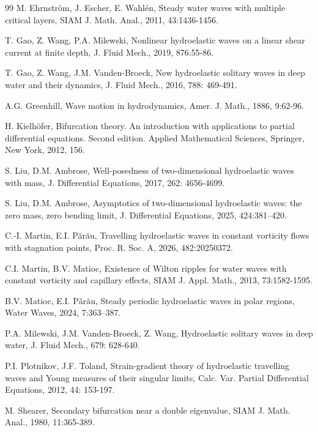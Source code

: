 \documentclass[12pt]{article}
\numberwithin{equation}{section}
\numberwithin{equation}{section}
\begin{document}
\begin{thebibliography}{99}
M. Ehrnstr\"{o}m, J. Escher, E. Wahl\'{e}n, Steady water waves with multiple critical layers, SIAM J. Math. Anal., 2011, 43:1436-1456.

T. Gao, Z. Wang, P.A. Milewski,  Nonlinear hydroelastic waves on a linear shear current at finite depth, J. Fluid Mech., 2019, 876:55-86.

T. Gao, Z. Wang, J.M. Vanden-Broeck, New hydroelastic solitary waves in deep water and their dynamics, J. Fluid Mech., 2016, 788: 469-491.

 A.G. Greenhill, Wave motion in hydrodynamics, Amer. J. Math., 1886, 9:62-96.

H. Kielh\"{o}fer, Bifurcation theory. An introduction with applications to partial differential equations. Second edition. Applied Mathematical Sciences, Springer, New York, 2012, 156.

S. Liu, D.M. Ambrose, Well-posedness of two-dimensional hydroelastic waves with mass, J. Differential Equations, 2017, 262: 4656-4699.

S. Liu, D.M. Ambrose, Asymptotics of two-dimensional hydroelastic waves: the zero mass, zero bending limit, J. Differential Equations, 2025, 424:381--420.

C.-I. Martin, E.I. P\u{a}r\u{a}u, Travelling hydroelastic waves in constant vorticity flows with stagnation points, Proc. R. Soc. A, 2026, 482:20250372.

C.I. Martin, B.V. Matioc, Existence of Wilton ripples for water waves with constant vorticity and capillary effects, SIAM J. Appl. Math., 2013, 73:1582-1595.

 B.V. Matioc, E.I. P\v{a}r\u{a}u, Steady periodic hydroelastic waves in polar regions, Water Waves, 2024, 7:363--387.

P.A. Milewski, J.M. Vanden-Broeck, Z. Wang, Hydroelastic solitary waves in deep water, J. Fluid Mech., 679: 628-640.

P.I. Plotnikov, J.F. Toland, Strain-gradient theory of hydroelastic travelling waves and Young measures of their singular limits, Calc. Var. Partial Differential Equations, 2012, 44: 153-197.


M. Shearer, Secondary bifurcation near a double eigenvalue, SIAM J. Math. Anal., 1980, 11:365-389.


\end{thebibliography}
\end{document}
